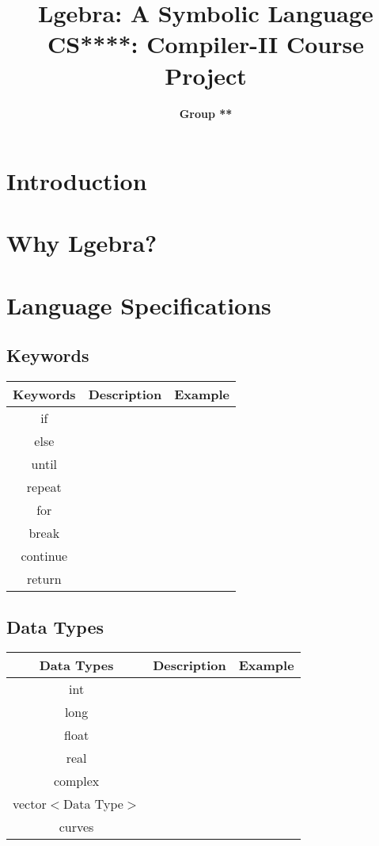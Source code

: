 \documentclass[12pt]{article}
\title{\LARGE \textbf{Lgebra: A Symbolic Language} \\\large \textbf{CS****: Compiler-II Course Project}}
\author{\textbf{Group **}}
\begin{document}
    \maketitle
    \tableofcontents

    \newpage
    \section{Introduction}
    \section{Why Lgebra?}
    \section{Language Specifications}
    \subsection{Keywords}
    \begin{table}[H]
        \centering
        \begin{tabular}{|c|c|c|}
            \hline
            \textbf{Keywords} & \textbf{Description} & \textbf{Example} \\
            \hline
            if & & \\
            \hline
            else & & \\
            \hline
            until & & \\
            \hline
            repeat & & \\
            \hline
            for & & \\
            \hline
            break & & \\
            \hline
            continue & & \\
            \hline
            return & & \\
            \hline
        \end{tabular}
    \end{table}
    \subsection{Data Types}
    \begin{table}[H]
        \centering
        \begin{tabular}{|c|c|c|}
            \hline
            \textbf{Data Types} & \textbf{Description} & \textbf{Example} \\
            \hline
            int & & \\
            \hline
            long & & \\
            \hline
            float & & \\
            \hline
            real & & \\
            \hline
            complex & & \\
            \hline
            vector$<$Data Type$>$ & & \\
            \hline
            curves & & \\
            \hline
        \end{tabular}
    \end{table}
\end{document}
